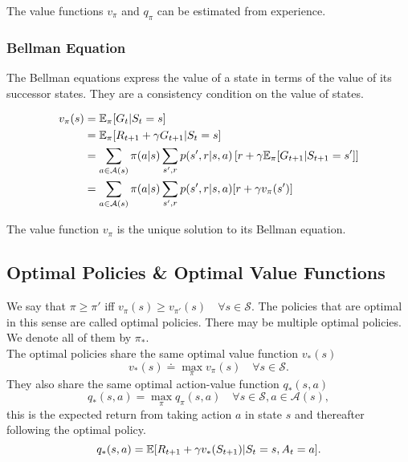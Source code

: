 The value functions $v_\pi$ and $q_\pi$ can be estimated from experience.\\

\subsubsection*{Bellman Equation}

The Bellman equations express the value of a state in terms of the value of its successor states. They are a consistency condition on the value of states. 

\begin{align}
    v_{\pi}(s) &= \mathbb{E}_\pi{}[G_t | S_t = s] \\
             &= \mathbb{E}_\pi{}[R_{t+1} + \gamma G_{t+1} | S_t = s] \\
             &= \sum_{a \in \mathcal{A}(s)} \pi(a|s) \sum_{s', r} p(s', r | s, a) \left[r + \gamma \mathbb{E}_\pi{}[G_{t+1} | S_{t+1} = s']\right] \\
             &=  \sum_{a \in \mathcal{A}(s)} \pi(a|s) \sum_{s', r} p(s', r | s, a) [r + \gamma v_{\pi}(s')]
\end{align} 
    

The value function $v_\pi$ is the unique solution to its Bellman equation.


\subsection{Optimal Policies \& Optimal Value Functions}
We say that $\pi \geq \pi'$ iff $v_\pi (s) \geq v_{\pi'}(s) \quad \forall s \in \mathcal{S}$. The policies that are optimal in this sense are called optimal policies. There may be multiple optimal policies. We denote all of them by $\pi_*$.\\

The optimal policies share the same optimal value function $v_*(s)$
\begin{equation}
    v_*(s) \doteq \max_\pi v_\pi(s) \quad \forall s \in \mathcal{S}.
\end{equation}
They also share the same optimal action-value function $q_*(s, a)$
\begin{equation}
    q_*(s, a) = \max_\pi q_\pi (s, a) \quad \forall s \in \mathcal{S}, a \in \mathcal{A}(s),
\end{equation}
this is the expected return from taking action $a$ in state $s$ and thereafter following the optimal policy.
\begin{equation}
    q_*(s, a) = \mathbb{E}{} [R_{t+1} + \gamma v_*(S_{t+1}) | S_{t} = s, A_t = a].
\end{equation}\\

